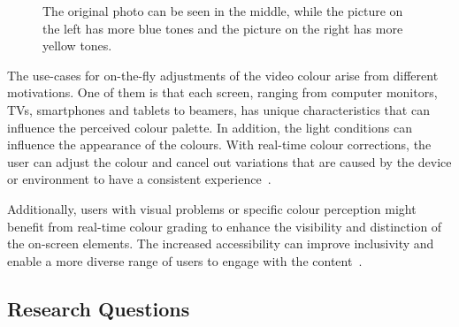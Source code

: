 \documentclass[../MasterThesis.tex]{subfiles}
\begin{document}
	
	\begin{figure}[H]
		\begin{center}
			\caption[Photo in three different colour tones (original, yellow, blue).]{The original photo can be seen in the middle, while the picture on the left has more blue tones and the picture on the right has more yellow tones.}
			\label{figure:coloursblueandyellow}
		\end{center}
	\end{figure}
	The use-cases for on-the-fly adjustments of the video colour arise from different motivations. 
	One of them is that each screen, ranging from computer monitors, TVs, smartphones and tablets to beamers, has unique characteristics that can influence the perceived colour palette. 
	In addition, the light conditions can influence the appearance of the colours.
	With real-time colour corrections, the user can adjust the colour and cancel out variations that are caused by the device or environment to have a consistent experience~\cite{screentype}.
	
	Additionally, users with visual problems or specific colour perception might benefit from real-time colour grading to enhance the visibility and distinction of the on-screen elements. 
	The increased accessibility can improve inclusivity and enable a more diverse range of users to engage with the content~\cite{accessibility}.
	
	
	

	
	
	
	
	
	
	
	
	
	
	
	\subsection{Research Questions} \label{subsection:researchquestions}
	
\end{document}
